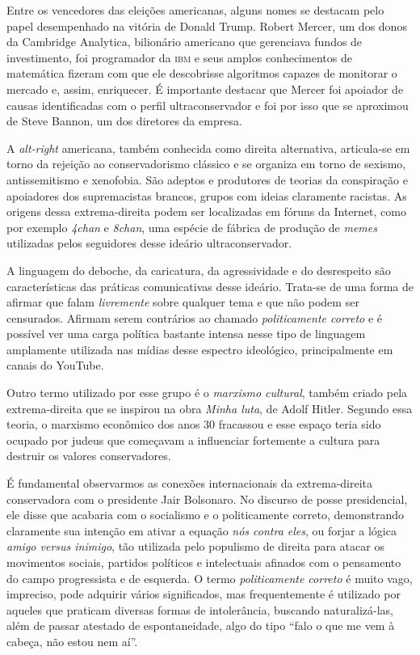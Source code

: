 Entre os vencedores das eleições americanas, alguns nomes se destacam
pelo papel desempenhado na vitória de Donald Trump. Robert Mercer, um
dos donos da Cambridge Analytica, bilionário americano que gerenciava
fundos de investimento, foi programador da \textsc{ibm} e seus amplos
conhecimentos de matemática fizeram com que ele descobrisse algoritmos
capazes de monitorar o mercado e, assim, enriquecer. É importante
destacar que Mercer foi apoiador de causas identificadas com o perfil
ultraconservador e foi por isso que se aproximou de Steve Bannon, um dos
diretores da empresa.

A \textit{alt-right} americana, também conhecida como direita alternativa,
articula-se em torno da rejeição ao conservadorismo clássico e se
organiza em torno de sexismo, antissemitismo e xenofobia. São adeptos e
produtores de teorias da conspiração e apoiadores dos supremacistas
brancos, grupos com ideias claramente racistas. As origens dessa extrema-direita podem ser localizadas em fóruns da Internet, como por exemplo
\textit{4chan} e \textit{8chan}, uma espécie de fábrica de produção de \textit{memes} utilizadas
pelos seguidores desse ideário ultraconservador.

A linguagem do deboche, da caricatura, da agressividade e do desrespeito
são características das práticas comunicativas desse ideário. Trata-se
de uma forma de afirmar que falam \textit{livremente} sobre qualquer tema e
que não podem ser censurados. Afirmam serem contrários ao chamado
\textit{politicamente correto} e é possível ver uma carga política bastante
intensa nesse tipo de linguagem amplamente utilizada nas mídias desse
espectro ideológico, principalmente em canais do YouTube.

Outro termo utilizado por esse grupo é o \textit{marxismo cultural}, também
criado pela extrema-direita que se inspirou na obra \textit{Minha luta},
de Adolf Hitler. Segundo essa teoria, o marxismo econômico dos anos 30
fracassou e esse espaço teria sido ocupado por judeus que começavam a
influenciar fortemente a cultura para destruir os valores conservadores.

É fundamental observarmos as conexões internacionais da extrema-direita
conservadora com o presidente Jair Bolsonaro. No discurso de posse
presidencial, ele disse que acabaria com o socialismo e o politicamente
correto, demonstrando claramente sua intenção em ativar a equação \textit{nós
contra eles}, ou forjar a lógica \textit{amigo versus inimigo}, tão utilizada
pelo populismo de direita para atacar os movimentos sociais, partidos
políticos e intelectuais afinados com o pensamento do campo progressista
e de esquerda. O termo \textit{politicamente correto} é muito vago,
impreciso, pode adquirir vários significados, mas frequentemente é
utilizado por aqueles que praticam diversas formas de intolerância,
buscando naturalizá-las, além de passar atestado de espontaneidade, algo
do tipo ``falo o que me vem à cabeça, não estou nem aí''.


